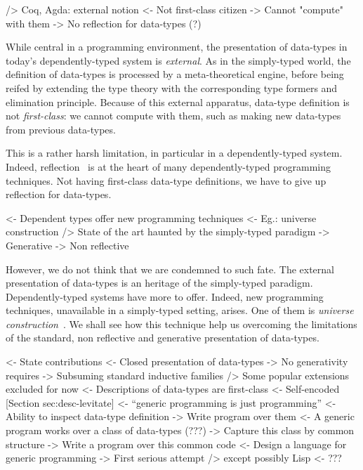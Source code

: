 \documentclass[preprint
              , authoryear
              ]{sigplanconf}
\newenvironment{wstructure}{\comment}{\endcomment}
\begin{document}
\begin{wstructure}
        /> Coq, Agda: external notion
            <- Not first-class citizen
            -> Cannot "compute" with them
            -> No reflection for data-types (?)
\end{wstructure}

While central in a programming environment, the presentation of
data-types in today's dependently-typed system is
\emph{external}. As in the simply-typed world, the definition of
data-types is processed by a meta-theoretical engine, before being
reifed by extending the type theory with the corresponding type
formers and elimination principle. Because of this external apparatus,
data-type definition is not \emph{first-class}: we cannot compute with
them, such as making new data-types from previous data-types. 

This is a rather harsh limitation, in particular in a
dependently-typed system. Indeed, reflection~\cite{allen:reflection,
  gregoire:ring-solver} is at the heart of many dependently-typed
programming techniques. Not having first-class data-type definitions,
we have to give up reflection for data-types.

\begin{wstructure}
    <- Dependent types offer new programming techniques
        <- Eg.: universe construction
        /> State of the art haunted by the simply-typed paradigm
            -> Generative
            -> Non reflective
\end{wstructure}

However, we do not think that we are condemned to such fate. The
external presentation of data-types is an heritage of the simply-typed
paradigm. Dependently-typed systems have more to offer. Indeed, new
programming techniques, unavailable in a simply-typed setting,
arises. One of them is \emph{universe
  construction}~\cite{martin-lof:itt}. We shall see how this technique
help us overcoming the limitations of the standard, non reflective and
generative presentation of data-types.

\begin{wstructure}
<- State contributions
    <- Closed presentation of data-types 
        -> No generativity requires
        -> Subsuming standard inductive families 
            /> Some popular extensions excluded for now
    <- Descriptions of data-types are first-class 
        <- Self-encoded [Section sec:desc-levitate]
    <- ``generic programming is just programming''
        <- Ability to inspect data-type definition
            -> Write program over them
        <- A generic program works over a class of data-types (???)
            -> Capture this class by common structure
            -> Write a program over this common code
    <- Design a language for generic programming
        -> First serious attempt
            /> except possibly Lisp
                <- ???
\end{wstructure}
\end{document}

